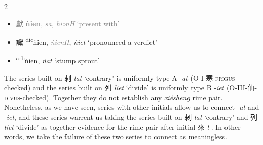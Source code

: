 \begin{multicols}{2}
\begin{minipage}{\columnwidth}
\begin{itemize}[leftmargin=*, labelsep=0.5em]
\begin{itemize}

\end{itemize}
\end{itemize}
\end{minipage}
\vspace{3mm}



\begin{itemize}
  \item \textcolor{gray}{{\Large{獻}} %
    {\large{\textbf{ṅien}}},
    \textit{sa, hiənH} `present with'} %


  \item {\Large{讞}} %
    {\large{{\textsuperscript{dic}}ṅien}},
    \textcolor{gray}{\textit{ṅienH}}, \textit{ṅiet} `pronounced a verdict' %

  \item {\Large{}} %
    {\large{{\textsuperscript{arb}}ṅien}},
    \textit{ṅat} `stump sprout' %
\end{itemize}
\end{multicols}


The series built on 剌
    \textit{lat} `contrary' %
    is uniformly type A -\textit{at} (O-I-寒-\textsc{frigus}-checked) and the series built on 列 \textit{liet} `divide’ is uniformly type B -\textit{iet} (O-III-仙-\textsc{divus}-checked). Together they do not establish any  \textit{xiéshēng} rime pair. 
    Nonetheless, as we have seen, series with other initials allow us to connect -\textit{at} and -\textit{iet}, and these series warrent us taking the series built on 剌
    \textit{lat} `contrary' %
    and 列 \textit{liet} `divide' as together evidence for the rime pair after initial 來 \textit{l}-. In other words, we take the failure of these two series to connect as meaningless. 

